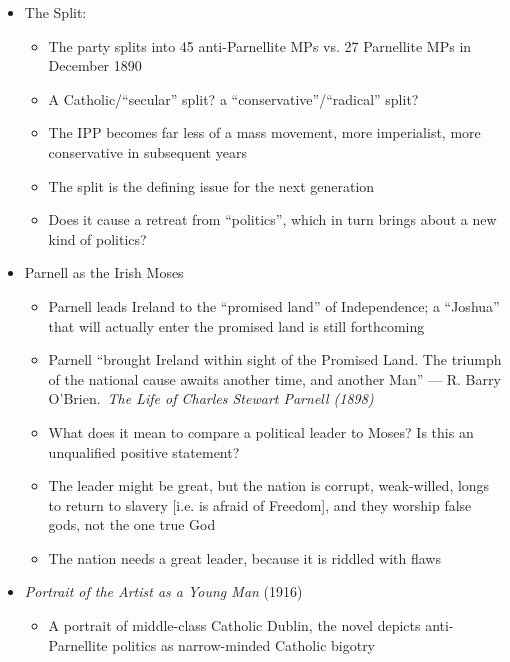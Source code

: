 \documentclass[12pt]{article}
\begin{document}
\begin{itemize}
                \item The Split:
                \begin{itemize}
                    \item The party splits into 45 anti-Parnellite MPs vs. 27 Parnellite MPs in December 1890
                    \item A Catholic/``secular'' split? a ``conservative''/``radical'' split?
                    \item The IPP becomes far less of a mass movement, more imperialist, more conservative in subsequent years
                    \item The split is the defining issue for the next generation
                    \item Does it cause a retreat from ``politics'', which in turn brings about a new kind of politics?
                \end{itemize}
                \item Parnell as the Irish Moses
                \begin{itemize}
                    \item Parnell leads Ireland to the ``promised land'' of Independence; a ``Joshua'' that will actually enter the promised land is still forthcoming
                    \item Parnell ``brought Ireland within sight of the Promised Land. The triumph of the national cause awaits another time, and another Man'' --- R. Barry O'Brien.\ \textit{The Life of Charles Stewart Parnell (1898)}
                    \item What does it mean to compare a political leader to Moses? Is this an unqualified positive statement?
                    \item The leader might be great, but the nation is corrupt, weak-willed, longs to return to slavery [i.e. is afraid of Freedom], and they worship false gods, not the one true God
                    \item The nation needs a great leader, because it is riddled with flaws
                \end{itemize}
                \item \textit{Portrait of the Artist as a Young Man} (1916)
                \begin{itemize}
                    \item A portrait of middle-class Catholic Dublin, the novel depicts anti-Parnellite politics as narrow-minded Catholic bigotry
                    \begin{itemize}

\end{itemize}
\end{itemize}
\end{itemize}
\end{document}
